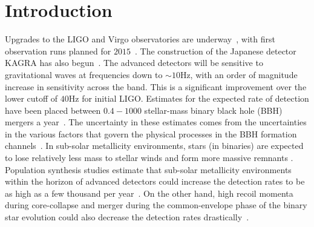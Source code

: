 
\section{Introduction}


Upgrades to the LIGO and Virgo observatories are
underway~\cite{Harry:2010zz,aVIRGO}, with first observation runs planned for
$2015$~\cite{Aasi:2013wya}. The construction of the Japanese detector KAGRA 
has also begun~\cite{Somiya:2011np}. The advanced detectors will be
sensitive to gravitational waves at frequencies down to 
$\sim 10$Hz, with an order of magnitude increase in sensitivity across the
band. This is a significant improvement over the lower cutoff of $40$Hz
for initial LIGO. Estimates for the expected rate of detection have
been placed between $0.4 - 1000$ stellar-mass binary black hole (BBH)
mergers a year~\cite{LSCCBCRates2010}. 
The uncertainty in these estimates comes from the uncertainties in the various
factors that govern the physical processes in the BBH formation 
channels~\cite{1973NInfo..27...86T,1973NInfo..27...70T}. 
In sub-solar metallicity environments, stars (in binaries) are expected to 
lose relatively less mass to stellar winds and form more massive remnants 
\cite{Webbink:1984ti,Kowalska:2012bb,Fryer:2011cx}. 
Population synthesis studies estimate that sub-solar metallicity environments
within the horizon of advanced detectors could increase the detection rates 
to be as high
as a few thousand per year~\cite{Dominik:2012kk,Belczynski:2012cx}. 
On the other hand, high recoil momenta during core-collapse and 
merger during the common-envelope phase of the binary star evolution
could also decrease the detection 
rates drastically~\cite{Fryer:2011cx,Dominik:2012kk}. 


